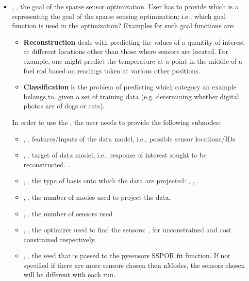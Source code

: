 \begin{itemize}
\item {}, , the goal of the sparse sensor optimization.
User has to provide  which is a  representing the goal of the sparse sensing optimization; i.e., which goal function is used in the optimization? Examples for such goal functions are:
\begin{itemize}
    \item \textbf{Reconstruction} deals with predicting the values of a quantity of interest at different locations other than those where sensors are located. For example, one might predict the temperature at a point in the middle of a fuel rod based on readings taken at various other positions.

    \item \textbf{Classification} is the problem of predicting which category an example belongs to, given a set of training data (e.g. determining whether digital photos are of dogs or cats).
\end{itemize}
In order to use the , the user needs to provide the following subnodes:
\begin{itemize}
	\item {}, , features/inputs of the data model, i.e., possible sensor locations/IDs
	\item {}, , target of data model, i.e., response of interest sought to be reconstructed.
  .
	\item {} , , the type of basis onto which the data are projected: , , . 
	\item {},  , the number of modes  used to project the data.
	\item {},  , the number of sensors used
	\item {},  , the optimizer used to find the sensors: ,  for unconstrained and cost constrained respectively.
        \item {}, , the seed that is passed to the pysensors SSPOR fit function.  If not specified if there are more sensors chosen then nModes, the sensors chosen will be different with each run.
\end{itemize}
\end{itemize}

